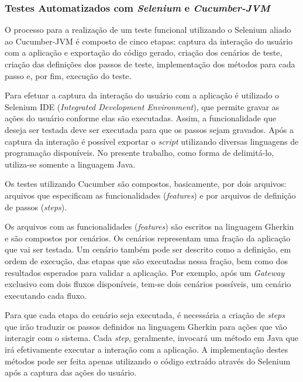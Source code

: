 \documentclass[12pt]{article}
\begin{document}
\subsubsection{Testes Automatizados com \emph{Selenium} e \emph{Cucumber-JVM}}

O processo para a realização de um teste funcional utilizando o Selenium aliado ao Cucumber-JVM é composto de cinco etapas: captura da interação do usuário com a aplicação e exportação do código gerado, criação dos cenários de teste, criação das definições dos passos de teste, implementação dos métodos para cada passo e, por fim, execução do teste.

Para efetuar a captura da interação do usuário com a aplicação é utilizado o Selenium IDE (\emph{Integrated Development Environment}), que permite gravar as ações do usuário conforme elas são executadas. Assim, a funcionalidade que deseja ser testada deve ser executada para que os passos sejam gravados. Após a captura da interação é possível exportar o \emph{script} utilizando diversas linguagens de programação disponíveis. No presente trabalho, como forma de delimitá-lo, utiliza-se somente a linguagem Java.

Os testes utilizando Cucumber são compostos, basicamente, por dois arquivos: arquivos que especificam as funcionalidades (\emph{features}) e por arquivos de definição de passos (\emph{steps}). 

Os arquivos com as funcionalidades (\emph{features}) são escritos na linguagem Gherkin~\cite{gherkin} e são compostos por cenários. Os cenários representam uma fração da aplicação que vai ser testada. Um cenário também pode ser descrito como a definição, em ordem de execução, das etapas que são executadas nessa fração, bem como dos resultados esperados para validar a aplicação. Por exemplo, após um \emph{Gateway} exclusivo com dois fluxos disponíveis, tem-se dois cenários possíveis, um cenário executando cada fluxo. 

Para que cada etapa do cenário seja executada, é necessária a criação de \emph{steps} que irão traduzir os passos definidos na linguagem Gherkin para ações que vão interagir com o sistema. Cada \emph{step}, geralmente, invocará um método em Java que irá efetivamente executar a interação com a aplicação. A implementação destes métodos pode ser feita apenas utilizando o código extraído através do Selenium após a captura das ações do usuário.
\end{document}
